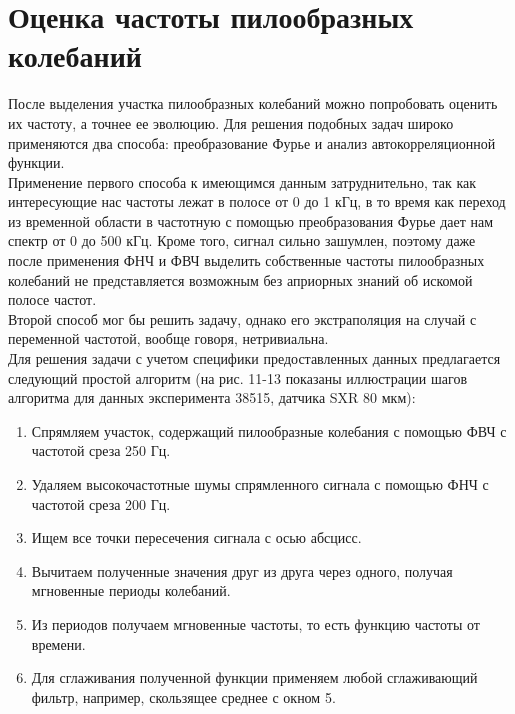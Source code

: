 \documentclass{report}
\begin{document}
\newpage

\section{Оценка частоты пилообразных колебаний}
После выделения участка пилообразных колебаний можно попробовать оценить их частоту, а точнее ее эволюцию. Для решения подобных задач широко применяются два способа: преобразование Фурье и анализ автокорреляционной функции.
\\

Применение первого способа к имеющимся данным затруднительно, так как интересующие нас частоты лежат в полосе от 0 до 1 кГц, в то время как переход из временной области в частотную с помощью преобразования Фурье дает нам спектр от 0 до 500 кГц. Кроме того, сигнал сильно зашумлен, поэтому даже после применения ФНЧ и ФВЧ выделить собственные частоты пилообразных колебаний не представляется возможным без априорных знаний об искомой полосе частот.
\\

Второй способ мог бы решить задачу, однако его экстраполяция на случай с переменной частотой, вообще говоря, нетривиальна.
\\

Для решения задачи с учетом специфики предоставленных данных предлагается следующий простой алгоритм (на рис. 11-13 показаны иллюстрации шагов алгоритма для данных эксперимента 38515, датчика SXR 80 мкм):
\begin{enumerate}
    \item Спрямляем участок, содержащий пилообразные колебания с помощью ФВЧ с частотой среза 250 Гц.
    \item Удаляем высокочастотные шумы спрямленного сигнала с помощью ФНЧ с частотой среза 200 Гц.
    \item Ищем все точки пересечения сигнала с осью абсцисс.
    \item Вычитаем полученные значения друг из друга через одного, получая мгновенные периоды колебаний.
    \item Из периодов получаем мгновенные частоты, то есть функцию частоты от времени.
    \item Для сглаживания полученной функции применяем любой сглаживающий фильтр, например, скользящее среднее с окном 5.
\end{enumerate}
\end{document}
